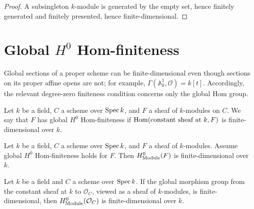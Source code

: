 \begin{proof}
  
  \leanok
  A subsingleton \(k\)-module is generated by the empty set, hence finitely generated and finitely presented, hence finite-dimensional.
\end{proof}


\section{Global \(H^0\) Hom-finiteness}
\label{sec:IsHModuleHomFinite_iter043}

Global sections of a proper scheme can be finite-dimensional even though sections on its proper affine opens are not; for example, \(\Gamma(\mathbb A^1_k,\mathcal O)=k[t]\). Accordingly, the relevant degree-zero finiteness condition concerns only the global Hom group.

\begin{definition}\leanok
  \label{thm:Scheme_IsHModuleHomFinite}
  
  Let \(k\) be a field, \(C\) a scheme over \(\operatorname{Spec} k\), and \(F\) a sheaf of \(k\)-modules on \(C\). We say that \(F\) has global \(H^0\) Hom-finiteness if \(\operatorname{Hom}(\text{constant sheaf at }k, F)\) is finite-dimensional over \(k\).
\end{definition}

\begin{theorem}\leanok
  \label{thm:Scheme_module_finite_HModule_zero_of_isHModuleHomFinite}
  Let \(k\) be a field, \(C\) a scheme over \(\operatorname{Spec} k\), and \(F\) a sheaf of \(k\)-modules. Assume global \(H^0\) Hom-finiteness holds for \(F\). Then \(H^0_{\mathrm{Module}}(F)\) is finite-dimensional over \(k\).
\end{theorem}

\begin{theorem}\leanok
  \label{thm:Scheme_module_finite_HModule_zero_of_isHModuleHomFinite_curve}
  Let \(k\) be a field and \(C\) a scheme over \(\operatorname{Spec} k\). If the global morphism group from the constant sheaf at \(k\) to \(\mathcal O_C\), viewed as a sheaf of \(k\)-modules, is finite-dimensional, then \(H^0_{\mathrm{Module}}(\mathcal O_C)\) is finite-dimensional over \(k\).
\end{theorem}

